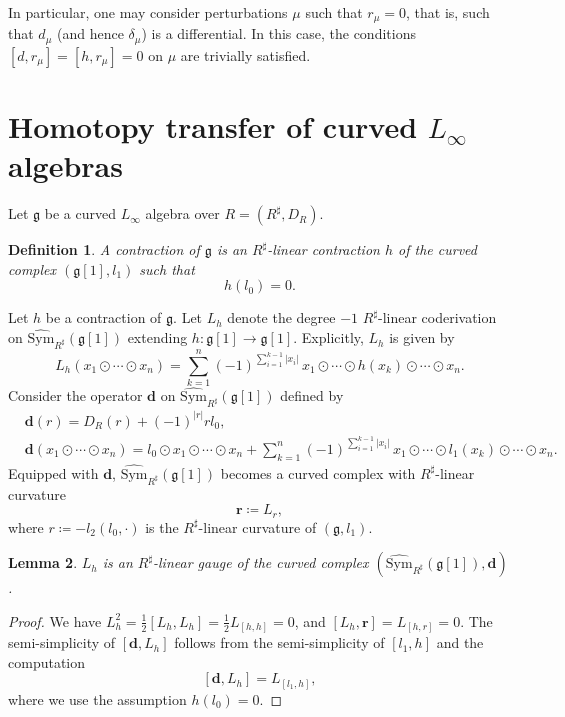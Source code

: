 \documentclass[12pt]{amsart}
\newtheorem{defn}{Definition}[section]
\newtheorem{lem}[defn]{Lemma}
\numberwithin{equation}{section}
\theoremstyle{plain}
\newcommand{\bfd}{\mathbf{d}}
\newcommand{\bfr}{\mathbf{r}}
\newcommand{\fg}{\mathfrak{g}}
\newcommand{\Sym}{\mathrm{Sym}}
\newcommand{\wSym}{\widehat{\Sym}}
\newcommand{\uR}{{R^\sharp}}
\begin{document}
	In particular, one may consider perturbations $\mu$ such that $r_\mu=0$, that is, such that $d_\mu$ (and hence $\delta_\mu$) is a differential. In this case, the conditions $[d,r_\mu]=[h,r_\mu]=0$ on $\mu$ are trivially satisfied. 
	

	
	\section{Homotopy transfer of curved \texorpdfstring{$L_\infty$}{L-infinity} algebras}\label{sec:htt}
	
	Let $\fg$ be a curved $L_\infty$ algebra over $R=(\uR, D_R)$. 
	\begin{defn}
		A \emph{contraction} of $\fg$ is an $\uR$-linear contraction $h$ of the curved complex $(\fg[1], l_1)$ such that
		\[
		h(l_0)=0.
		\]
	\end{defn}
	
	Let $h$ be a contraction of $\fg$. Let $L_h$ denote the degree $-1$ $\uR$-linear coderivation on $\wSym_\uR(\fg[1])$ extending $h\colon \fg[1] \to \fg[1]$. Explicitly, $L_h$ is given by
	\[
	L_h(x_1 \odot \cdots \odot x_n)
	=
	\sum_{k=1}^n (-1)^{\sum_{i=1}^{k-1}|x_i|}\,
	x_1 \odot \cdots \odot h(x_k)\odot \cdots \odot x_n.
	\]
	Consider the operator $\bfd$ on $\wSym_\uR(\fg[1])$ defined by
	\begin{align*}
		&\bfd(r)= D_R(r) + (-1)^{|r|}rl_0, \\
		&\bfd (x_1 \odot \cdots \odot x_n)
		= l_0 \odot x_1 \odot \cdots \odot x_n + \sum_{k=1}^n (-1)^{\sum_{i=1}^{k-1}|x_i|}\,
		x_1 \odot \cdots \odot l_1(x_k)\odot \cdots \odot x_n.
	\end{align*}
	Equipped with $\bfd$, $\wSym_\uR(\fg[1])$ becomes a curved complex with $\uR$-linear curvature
	\[
	\bfr \coloneqq L_{r},
	\]
	where $r \coloneqq -l_2(l_0, \cdot)$ is the $\uR$-linear curvature of $(\fg,l_1)$.
	
	\begin{lem}
		$L_h$ is an $\uR$-linear gauge of the curved complex $(\wSym_\uR(\fg[1]), \bfd)$.
	\end{lem}
	\begin{proof}
		We have $L_h^2 = \frac{1}{2}[L_h,L_h] = \frac{1}{2}L_{[h,h]} = 0$, and $[L_h, \bfr]=L_{[h,r]}=0$. The semi-simplicity of $[\bfd, L_h]$ follows from the semi-simplicity of $[l_1,h]$ and the computation
	\begin{equation}\label{ll1h}
		[\bfd, L_h] =  L_{[l_1,h]}, 
	\end{equation}
	where we use the assumption $h(l_0)=0$.
	\end{proof}
	
\end{document}
